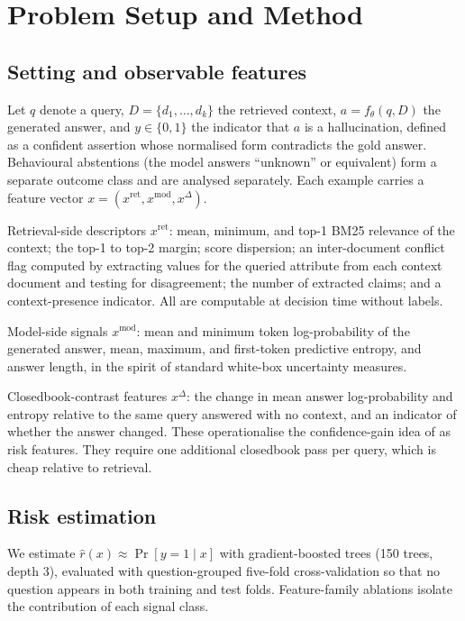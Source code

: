 \documentclass[11pt]{article}
\begin{document}
\section{Problem Setup and Method}\label{sec:method}

\subsection{Setting and observable features}
Let $q$ denote a query, $D = \{d_1, \dots, d_k\}$ the retrieved
context, $a = f_\theta(q, D)$ the generated answer, and
$y \in \{0, 1\}$ the indicator that $a$ is a hallucination, defined as
a confident assertion whose normalised form contradicts the gold
answer. Behavioural abstentions (the model answers ``unknown'' or
equivalent) form a separate outcome class and are analysed separately.
Each example carries a feature vector
$x = (x^{\mathrm{ret}}, x^{\mathrm{mod}}, x^{\Delta})$.

Retrieval-side descriptors $x^{\mathrm{ret}}$: mean, minimum, and top-1
BM25 relevance of the context; the top-1 to top-2 margin; score
dispersion; an inter-document conflict flag computed by extracting
values for the queried attribute from each context document and testing
for disagreement; the number of extracted claims; and a
context-presence indicator. All are computable at decision time without
labels.

Model-side signals $x^{\mathrm{mod}}$: mean and minimum token
log-probability of the generated answer, mean, maximum, and first-token
predictive entropy, and answer length, in the spirit of standard
white-box uncertainty measures.

Closedbook-contrast features $x^{\Delta}$: the change in mean answer
log-probability and entropy relative to the same query answered with no
context, and an indicator of whether the answer changed. These
operationalise the confidence-gain idea of \citet{bi2025ckplug} as risk
features. They require one additional closedbook pass per query, which
is cheap relative to retrieval.

\subsection{Risk estimation}
We estimate $\hat r(x) \approx \Pr[y = 1 \mid x]$ with
gradient-boosted trees (150 trees, depth 3), evaluated with
question-grouped five-fold cross-validation so that no question appears
in both training and test folds. Feature-family ablations isolate the
contribution of each signal class.
\end{document}

